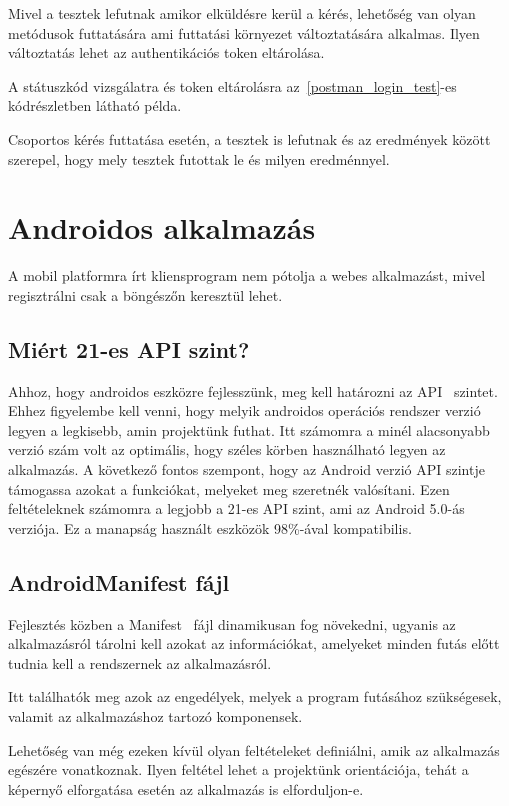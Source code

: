 \documentclass[
]{thesis-ekf}
\theoremstyle{definition}
\theoremstyle{remark}
\begin{document}
	Mivel a tesztek lefutnak amikor elküldésre kerül a kérés, lehetőség van olyan metódusok futtatására ami futtatási környezet változtatására alkalmas. Ilyen változtatás lehet az authentikációs token eltárolása.
	
	A státuszkód vizsgálatra és token eltárolásra az~\ref{postman_login_test}-es kódrészletben látható példa.
	
	Csoportos kérés futtatása esetén, a tesztek is lefutnak és az eredmények között szerepel, hogy mely tesztek futottak le és milyen eredménnyel.
	
	 
	
	\chapter{Androidos alkalmazás}
	A mobil platformra írt kliensprogram nem pótolja a webes alkalmazást, mivel regisztrálni csak a böngészőn keresztül lehet. 
	\section{Miért 21-es API szint?}
	Ahhoz, hogy androidos eszközre fejlesszünk, meg kell határozni az API~\cite{android_api_level} szintet. Ehhez figyelembe kell venni, hogy melyik androidos operációs rendszer verzió legyen a legkisebb, amin projektünk futhat. Itt számomra a minél alacsonyabb verzió szám volt az optimális, hogy széles körben használható legyen az alkalmazás. A következő fontos szempont, hogy az Android verzió API szintje támogassa azokat a funkciókat, melyeket meg szeretnék valósítani. Ezen feltételeknek számomra a legjobb a 21-es API szint, ami az Android 5.0-ás verziója. Ez a manapság használt eszközök 98\%-ával kompatibilis.
	
	\section{AndroidManifest fájl}
	Fejlesztés közben a Manifest~\cite{android_manifest} fájl dinamikusan fog növekedni, ugyanis az alkalmazásról tárolni kell azokat az információkat, amelyeket minden futás előtt tudnia kell a rendszernek az alkalmazásról.
	
	Itt találhatók meg azok az engedélyek, melyek a program futásához szükségesek, valamit az alkalmazáshoz tartozó komponensek. 
	
	Lehetőség van még ezeken kívül olyan feltételeket definiálni, amik az alkalmazás egészére vonatkoznak. Ilyen feltétel lehet a projektünk orientációja, tehát a képernyő elforgatása esetén az alkalmazás is elforduljon-e.
	
\end{document}
